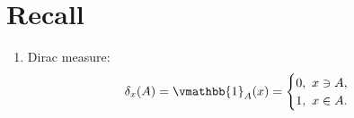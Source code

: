 \section*{Recall}
\begin{enumerate}[label=(\roman*)]
    \item Dirac measure:
    \begin{align*}
        \delta_{x}(A) = \vmathbb{1}_{A}(x) = \begin{cases}
            0, \ x\ni A, \\
            1, \ x\in A.
        \end{cases}
    \end{align*}
\end{enumerate}
